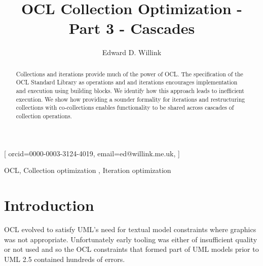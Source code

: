 \documentclass[
]{ceurart}
\begin{document}


\title{OCL Collection Optimization - Part 3 - Cascades}

\author[1,2]{Edward D. Willink}[%
orcid=0000-0003-3124-4019,
email=ed@willink.me.uk,
]
\cormark[1]
\fnmark[1]
\address[1]{Willink Transformations Ltd, Reading England}
\address[2]{Eclipse Foundation}



\begin{abstract}
Collections and iterations provide much of the power of OCL. The specification of the OCL Standard Library as operations and and iterations encourages implementation and execution using building blocks. We identify how this approach leads to inefficient execution. We show how providing a sounder formality for iterations and restructuring collections with co-collections enables functionality to be shared across cascades of collection operations.
\end{abstract}

\begin{keywords}
  OCL\sep
  Collection optimization \sep
  Iteration optimization
\end{keywords}

\maketitle

\section{Introduction}

OCL \cite{OCL-2.4} evolved to satisfy UML's need for textual model constraints where graphics was not appropriate. Unfortunately early tooling was either of insufficient quality or not used and so the OCL constraints that formed part of UML models prior to UML 2.5 contained hundreds of errors.
\end{document}
